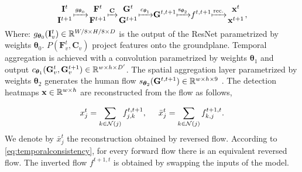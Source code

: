 \documentclass[10pt,twocolumn,letterpaper]{article}
\begin{document}
\begin{equation}
\genfrac{}{}{0pt}{}{\ve I^t}{\ve I^{t+1}} \hspace{-0.1cm} \xmapsto{g_{\mbs\theta_0}} \hspace{-0.1cm}
\genfrac{}{}{0pt}{}{\ve F^t}{\ve F^{t+1}} \hspace{-0.1cm} \xmapsto{\mathbf{C}} \hspace{-0.1cm}
\genfrac{}{}{0pt}{}{\ve G^t}{\ve G^{t+1}} \hspace{-0.1cm} \xmapsto{c_{\mbs\theta_1}} \hspace{-0.1cm}
\ve G^{t,t+1} \hspace{-0.1cm} \xmapsto{\mathrm{s_{\mbs\theta_2}}} \hspace{-0.1cm}
f^{t,t+1}  \hspace{-0.1cm} \xmapsto{\mathrm{rec.}} \hspace{-0.1cm}
\genfrac{}{}{0pt}{}{\ve x^t}{\ve x^{t+1}},
\label{eq:pipe}
\end{equation}
Where:
$g_{\boldsymbol{\theta}_{0}}(\mathbf{I}^t_v) \in \mathbb{R}^{W/8 \times H/8 \times D}$ is the output of the ResNet parametrized by weights $\boldsymbol{\theta}_{0}$. $P(\mathbf{F}_v^t, \mathbf{C}_{v})$ project features onto the groundplane.
Temporal aggregation is achieved with a convolution parametrized by weights $\boldsymbol{\theta}_{1}$ and output $c_{\boldsymbol{\theta}_{1}}(\mathbf{G}^t_v, \mathbf{G}^{t+1}_v) \in \mathbb{R}^{w \times h \times D'}$. 
The spatial aggregation layer parametrized by weights $\boldsymbol{\theta}_{2}$ generates the human flow $s_{\boldsymbol{\theta}_{2}}(\mathbf{G}^{t,t+1}) \in \mathbb{R}^{w \times h \times 9}$ .
The detection heatmaps $\mathbf{x} \in \mathbb{R}^{w \times h} $ are reconstructed from the flow as follows,

\begin{equation}
    \begin{split}
    x_{j}^{t}=\sum_{k \in \mathcal{N}(j)} f_{j, k}^{t, t+1},  \hspace{5mm}  \bar x_{j}^{t}=\sum_{k \in \mathcal{N}(j)} f_{k, j}^{t+1, t}.
    \end{split}
    \label{eq:detreconstruction}
\end{equation}
We denote by $\bar x_{j}^{t}$ the reconstruction obtained by reversed flow. According to \cref{eq:temporalconsistency}, 
for every forward flow there is an equivalent reversed flow. The inverted flow $f^{t+1, t}$ is obtained by swapping the inputs of the model.
\end{document}
